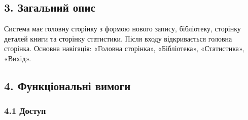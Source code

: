 \documentclass[
]{article}
\begin{document}
\hypertarget{3-ux437ux430ux433ux430ux43bux44cux43dux438ux439-ux43eux43fux438ux441}{%
\subsection{3. Загальний
опис}\label{3-ux437ux430ux433ux430ux43bux44cux43dux438ux439-ux43eux43fux438ux441}}

Система має головну сторінку з формою нового запису, бібліотеку,
сторінку деталей книги та сторінку статистики. Після входу відкривається
головна сторінка. Основна навігація: «Головна сторінка», «Бібліотека»,
«Статистика», «Вихід».

\hypertarget{4-ux444ux443ux43dux43aux446ux456ux43eux43dux430ux43bux44cux43dux456-ux432ux438ux43cux43eux433ux438}{%
\subsection{4. Функціональні
вимоги}\label{4-ux444ux443ux43dux43aux446ux456ux43eux43dux430ux43bux44cux43dux456-ux432ux438ux43cux43eux433ux438}}

\hypertarget{41-ux434ux43eux441ux442ux443ux43f}{%
\subsubsection{4.1 Доступ}\label{41-ux434ux43eux441ux442ux443ux43f}}
\end{document}
